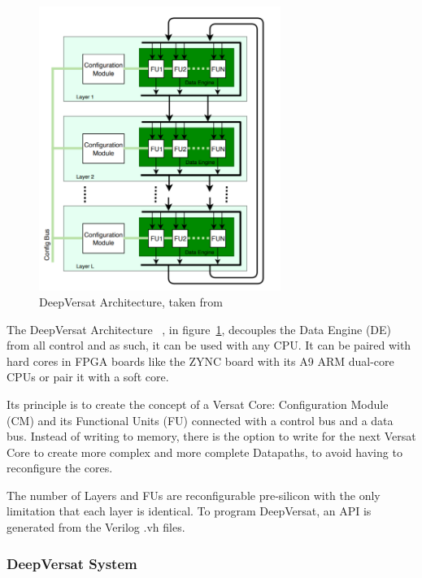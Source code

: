 \begin{figure}[!htb]
    \centering
    \includegraphics[width=0.7\textwidth]{Figures/deep-Versat.png}
    \caption{DeepVersat Architecture, taken from~\cite{valter:deepversat}}
    \label{figure:deepversatarch}
\end{figure} 

\quad The DeepVersat Architecture~\cite{valter:deepversat}
, in figure~\ref{figure:deepversatarch}, decouples the Data Engine (DE) from all control and as such, it can be used with any CPU. 
It can be paired with hard cores in
FPGA boards like the ZYNC board %
with its A9 ARM dual-core CPUs or pair it with a soft core.

Its principle is to create the concept of a Versat Core: Configuration Module (CM) and its Functional Units (FU) connected with a control bus and a data bus.
Instead of writing to memory, there is the option to write for the next
Versat Core to create more complex and more complete Datapaths, to avoid
having to reconfigure the cores.

The number of Layers and FUs are reconfigurable pre-silicon with the only limitation
that each layer is identical. To program DeepVersat, an API is generated
from the Verilog .vh files. 




\newpage
\subsubsection{DeepVersat System}

